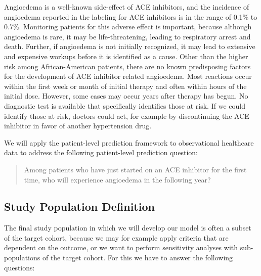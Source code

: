 \documentclass[11pt]{book}
\theoremstyle{definition}
\theoremstyle{definition}
\theoremstyle{definition}
\theoremstyle{remark}
\begin{document}
Angioedema is a well-known side-effect of ACE inhibitors, and the
incidence of angioedema reported in the labeling for ACE inhibitors is
in the range of 0.1\% to 0.7\%. \citep{byrd_2006} Monitoring patients
for this adverse effect is important, because although angioedema is
rare, it may be life-threatening, leading to respiratory arrest and
death. \citep{norman_2013} Further, if angioedema is not initially
recognized, it may lead to extensive and expensive workups before it is
identified as a cause. \citep{norman_2013, thompson_1993} Other than the
higher risk among African-American patients, there are no known
predisposing factors for the development of ACE inhibitor related
angioedema. \citep{byrd_2006} Most reactions occur within the first week
or month of initial therapy and often within hours of the initial dose.
\citep{circardi_2004} However, some cases may occur years after therapy
has begun. \citep{mara_1996} No diagnostic test is available that
specifically identifies those at risk. If we could identify those at
risk, doctors could act, for example by discontinuing the ACE inhibitor
in favor of another hypertension drug. 

We will apply the patient-level prediction framework to observational
healthcare data to address the following patient-level prediction
question:

\begin{quote}
Among patients who have just started on an ACE inhibitor for the first
time, who will experience angioedema in the following year?
\end{quote}

\subsection{Study Population
Definition}\label{study-population-definition}

The final study population in which we will develop our model is often a
subset of the target cohort, because we may for example apply criteria
that are dependent on the outcome, or we want to perform sensitivity
analyses with sub-populations of the target cohort. For this we have to
answer the following questions:
\end{document}

